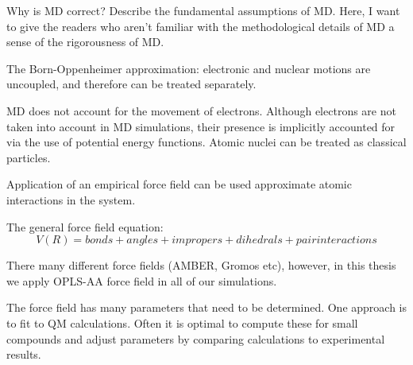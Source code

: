 \begin{outline}
	\1 Why is MD correct? Describe the fundamental assumptions of MD. Here, I want to give the readers who aren't familiar with the methodological details of MD a sense of the rigorousness of MD.
	
		\2 The Born-Oppenheimer approximation: electronic and nuclear motions are uncoupled, and therefore can be treated separately. 
	
		\2 MD does not account for the movement of electrons. Although electrons are not taken into account in MD simulations, their presence is implicitly accounted for via the use of potential energy functions.  Atomic nuclei can be treated as classical particles.



  \2 Application of an empirical force field can be used approximate atomic interactions in the system.

      \3 The general force field equation:
      	\[ V(R) = bonds + angles + impropers + dihedrals + pair interactions \]

      \3 There many different force fields (AMBER, Gromos etc), however, in this thesis we apply OPLS-AA force field in all of our simulations.

      \3 The force field has many parameters that need to be determined. One approach is to fit to QM calculations.  Often it is optimal to compute these for small compounds and adjust parameters by comparing calculations to experimental results.

\end{outline}

